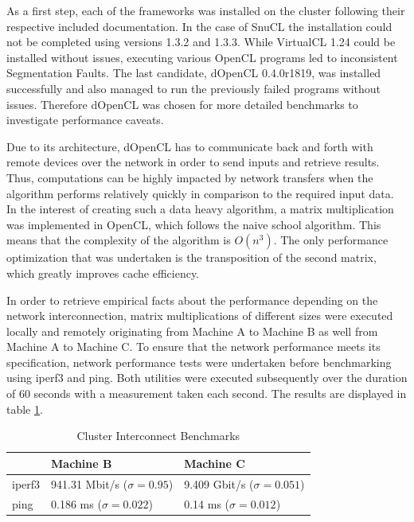 As a first step, each of the frameworks was installed on the cluster following their respective included documentation. In the case of SnuCL the installation could not be completed using versions 1.3.2 and 1.3.3. While VirtualCL 1.24 could be installed without issues, executing various OpenCL programs led to inconsistent Segmentation Faults. The last candidate, dOpenCL 0.4.0r1819, was installed successfully and also managed to run the previously failed programs without issues. Therefore dOpenCL was chosen for more detailed benchmarks to investigate performance caveats.

Due to its architecture, dOpenCL has to communicate back and forth with remote devices over the network in order to send inputs and retrieve results. Thus, computations can be highly impacted by network transfers when the algorithm performs relatively quickly in comparison to the required input data. In the interest of creating such a data heavy algorithm, a matrix multiplication was implemented in OpenCL, which follows the naive school algorithm. This means that the complexity of the algorithm is $O(n^3)$. The only performance optimization that was undertaken is the transposition of the second matrix, which greatly improves cache efficiency.

In order to retrieve empirical facts about the performance depending on the network interconnection, matrix multiplications of different sizes were executed locally and remotely originating from Machine A to Machine B as well from Machine A to Machine C. To ensure that the network performance meets its specification, network performance tests were undertaken before benchmarking using iperf3 and ping. Both utilities were executed subsequently over the duration of 60 seconds with a measurement taken each second. The results are displayed in table \ref{table:cluster_interconnect_benchmarks}.

\begin{table}[!htb]
	\centering
	\begin{adjustbox}{width=0.5\textwidth}
		\small
		\begin{tabular}{l | l | l}
			~                     & Machine B                  			& Machine C                  \\
			\hline
			iperf3                & 941.31 Mbit/s ($\sigma = 0.95$) 	& 9.409 Gbit/s ($\sigma = 0.051$) \\
			ping                  & 0.186 ms ($\sigma = 0.022$)  		& 0.14 ms ($\sigma = 0.012$)  \\
		\end{tabular}
	\end{adjustbox}
	
	\caption{Cluster Interconnect Benchmarks}
	\label{table:cluster_interconnect_benchmarks}
\end{table}

